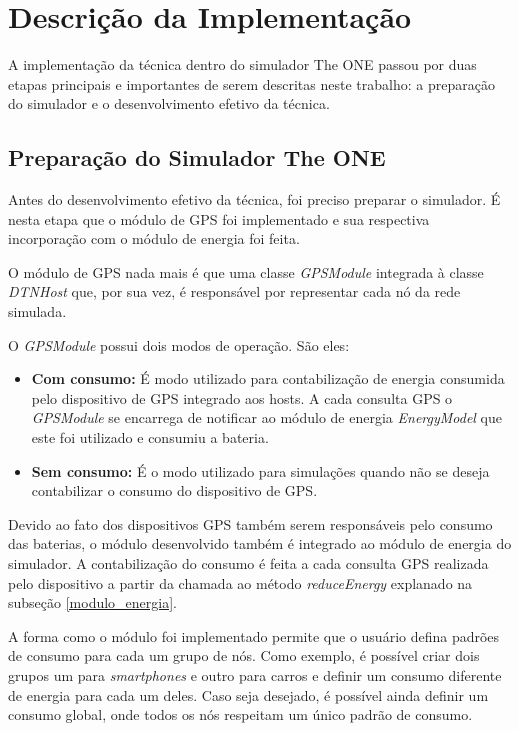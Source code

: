 \section{Descrição da Implementação}

A implementação da técnica dentro do simulador The ONE passou por duas etapas principais e importantes de serem descritas neste trabalho: a preparação do simulador e o desenvolvimento efetivo da técnica.

\subsection{Preparação do Simulador The ONE}

Antes do desenvolvimento efetivo da técnica, foi preciso preparar o simulador. É nesta etapa que o módulo de GPS foi implementado e sua respectiva incorporação com o módulo de energia foi feita.

O módulo de GPS nada mais é que uma classe \emph{GPSModule} integrada à classe \emph{DTNHost} que, por sua vez, é responsável por representar cada nó da rede simulada. 

O \emph{GPSModule} possui dois modos de operação. São eles:

\begin{itemize}
    \item \textbf{Com consumo:} É modo utilizado para contabilização de energia consumida pelo dispositivo de GPS integrado aos hosts. A cada consulta GPS o \emph{GPSModule} se encarrega de notificar ao módulo de energia \emph{EnergyModel} que este foi utilizado e consumiu a bateria.
    \item \textbf{Sem consumo:} É o modo utilizado para simulações quando não se deseja contabilizar o consumo do dispositivo de GPS.
\end{itemize}

Devido ao fato dos dispositivos GPS também serem responsáveis pelo consumo das baterias, o módulo desenvolvido também é integrado ao módulo de energia do simulador. A contabilização do consumo é feita a cada consulta GPS realizada pelo dispositivo a partir da chamada ao método \emph{reduceEnergy} explanado na subseção \ref{modulo_energia}.

A forma como o módulo foi implementado permite que o usuário defina padrões de consumo para cada um grupo de nós. Como exemplo, é possível criar dois grupos um para \emph{smartphones} e outro para carros e definir um consumo diferente de energia para cada um deles. Caso seja desejado, é possível ainda definir um consumo global, onde todos os nós respeitam um único padrão de consumo.

